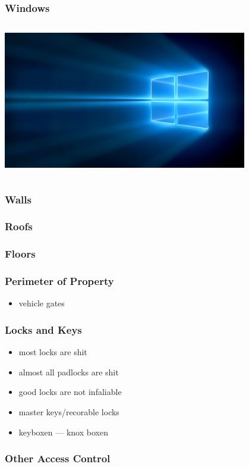 \documentclass[]{beamer}
\begin{document}
\begin{frame}
  \frametitle{Windows}
  \begin{columns}
    \includegraphics[width=0.8\textwidth]{Windows_10_Hero}
  \end{columns}
\end{frame}

\begin{frame}
  \frametitle{Walls}
\end{frame}

\begin{frame}
  \frametitle{Roofs}
\end{frame}

\begin{frame}
  \frametitle{Floors}
\end{frame}

\begin{frame}
  \frametitle{Perimeter of Property}
  \begin{itemize}
    \item vehicle gates
  \end{itemize}
\end{frame}

\begin{frame}
  \frametitle{Locks and Keys}
  \begin{itemize}
    \item most locks are shit
    \item almost all padlocks are shit
    \item good locks are not infaliable
    \item master keys/recorable locks
    \item keyboxen --- knox boxen
  \end{itemize}
\end{frame}

\begin{frame}
  \frametitle{Other Access Control}
\end{frame}
\end{document}
